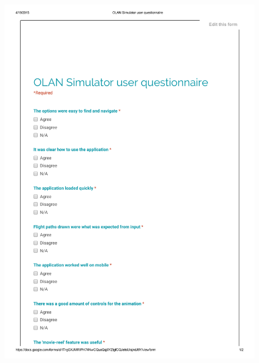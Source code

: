 \begin{figure}[h!]
    \includegraphics[width=15cm,height=18cm,page=2]{images/questionnaire.pdf}
\end{figure}

\clearpage

